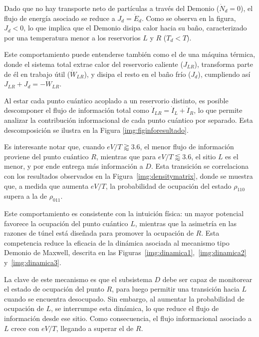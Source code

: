 Dado que no hay transporte neto de partículas a través del Demonio ($\dot{N}_{d} = 0$), el flujo de energía asociado se reduce a $J_{d} = \dot{E}_{d}$. Como se observa en la figura, $J_{d} < 0$, lo que implica que el Demonio disipa calor hacia su baño, caracterizado por una temperatura menor a los reservorios $L$ y $R$ ($T_d < T$). 

Este comportamiento puede entenderse también como el de una máquina térmica, donde el sistema total extrae calor del reservorio caliente ($J_{LR}$), transforma parte de él en trabajo útil ($\dot{W}_{LR}$), y disipa el resto en el baño frío ($J_{d}$), cumpliendo así $J_{LR} + J_{d} = -\dot{W}_{LR}$.

Al estar cada punto cuántico acoplado a un reservorio distinto, es posible descomponer el flujo de información total como $\dot{I}_{LR} = \dot{I}_{L} + \dot{I}_{R}$, lo que permite analizar la contribución informacional de cada punto cuántico por separado. Esta descomposición se ilustra en la Figura \ref{img:figinforesultado}.



Es interesante notar que, cuando \( eV/T \gtrapprox 3.6 \), el menor flujo de información proviene del punto cuántico \( R \), mientras que para \( eV/T \lessapprox 3.6 \), el sitio \( L \) es el menor, y por ende entrega más información a $D$. Esta transición se correlaciona con los resultados observados en la Figura~\ref{img:densitymatrix}, donde se muestra que, a medida que aumenta \( eV/T \), la probabilidad de ocupación del estado \( \rho_{110} \) supera a la de \( \rho_{011} \).

Este comportamiento es consistente con la intuición física: un mayor potencial favorece la ocupación del punto cuántico \( L \), mientras que la asimetría en las razones de túnel está diseñada para promover la ocupación de \( R \). Esta competencia reduce la eficacia de la dinámica asociada al mecanismo tipo Demonio de Maxwell, descrita en las Figuras~\ref{img:dinamica1},~\ref{img:dinamica2} y~\ref{img:dinamica3}.

La clave de este mecanismo es que el subsistema \( D \) debe ser capaz de monitorear el estado de ocupación del punto \( R \), para luego permitir una transición hacia \( L \) cuando se encuentra desocupado. Sin embargo, al aumentar la probabilidad de ocupación de \( L \), se interrumpe esta dinámica, lo que reduce el flujo de información desde ese sitio. Como consecuencia, el flujo informacional asociado a \( L \) crece con \( eV/T \), llegando a superar el de \( R \).

